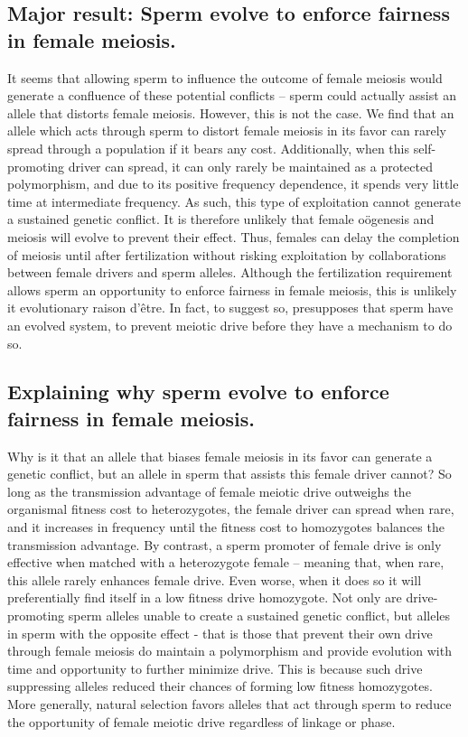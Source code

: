 \documentclass[12pt,letterpaper]{article}
\newcommand{\yb}[1]{{ \color{blue} #1}}
\begin{document}
\subsection*{Major result: Sperm evolve to enforce fairness in female meiosis.} 
It seems that allowing sperm to influence the outcome of female meiosis would generate a confluence of these potential conflicts -- 
	sperm could actually assist an allele that distorts female meiosis.
However, this is not the case.
We find that an allele which acts through sperm to distort female meiosis in its favor %
	can rarely spread through a population if it bears any cost. 
Additionally, when this self-promoting driver can spread, it can only rarely 
	be maintained as a protected polymorphism, and due to its positive frequency dependence,  
	it spends very little time at intermediate frequency.
As such, this type of exploitation cannot generate a sustained genetic conflict.
It is therefore unlikely
	that female o\"{o}genesis and meiosis will evolve to prevent their effect.  
Thus, females can delay the completion of meiosis until after fertilization 
	without risking exploitation by collaborations between female
        drivers and sperm alleles. 
\yb{Although the fertilization requirement allows sperm an opportunity to enforce fairness in female meiosis, 
	this is unlikely it evolutionary raison d'\^{e}tre. 
In fact, to suggest so, presupposes that sperm have an evolved system, to prevent meiotic drive before they have a mechanism to do so.}
\newline 

\subsection*{Explaining why sperm evolve to enforce fairness in female meiosis.} 
Why is it that an allele that biases female meiosis in its favor can
generate a genetic conflict, 
but an allele in sperm that assists this female driver cannot? 
So long as the transmission advantage of female meiotic drive outweighs 
the organismal fitness cost to heterozygotes, 
the female driver can spread when rare, and it increases in 		
	frequency until the fitness cost to homozygotes balances the transmission advantage.
By contrast, a sperm promoter of female drive is only effective when matched with a heterozygote female -- meaning that, when rare, this allele rarely enhances female drive. 
Even worse, when it does so it will preferentially find itself in a low fitness drive homozygote. 
Not only are drive-promoting sperm alleles unable to create a sustained genetic conflict, 
	but alleles in sperm with the opposite effect - that is those that prevent their own drive through female meiosis do maintain a polymorphism and 
	provide evolution  with time and opportunity to further minimize drive.
This is because such drive suppressing alleles reduced their chances
of forming low fitness homozygotes. 
More generally, natural selection favors alleles that act through sperm to
 reduce the opportunity of female meiotic drive regardless of linkage or phase. \newline 
 
\end{document}
